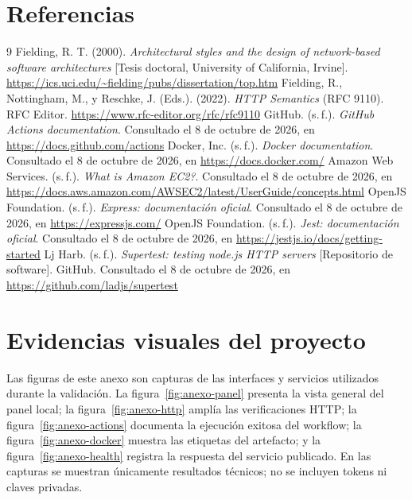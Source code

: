 \documentclass[12pt,letterpaper]{article}
\begin{document}
\section{Referencias}
\begin{thebibliography}{9}
 Fielding, R. T. (2000). \textit{Architectural styles and the design of network-based software architectures} [Tesis doctoral, University of California, Irvine]. \url{https://ics.uci.edu/~fielding/pubs/dissertation/top.htm}
 Fielding, R., Nottingham, M., y Reschke, J. (Eds.). (2022). \textit{HTTP Semantics} (RFC 9110). RFC Editor. \url{https://www.rfc-editor.org/rfc/rfc9110}
 GitHub. (s.\,f.). \textit{GitHub Actions documentation}. Consultado el 8 de octubre de 2026, en \url{https://docs.github.com/actions}
 Docker, Inc. (s.\,f.). \textit{Docker documentation}. Consultado el 8 de octubre de 2026, en \url{https://docs.docker.com/}
 Amazon Web Services. (s.\,f.). \textit{What is Amazon EC2?}. Consultado el 8 de octubre de 2026, en \url{https://docs.aws.amazon.com/AWSEC2/latest/UserGuide/concepts.html}
 OpenJS Foundation. (s.\,f.). \textit{Express: documentación oficial}. Consultado el 8 de octubre de 2026, en \url{https://expressjs.com/}
 OpenJS Foundation. (s.\,f.). \textit{Jest: documentación oficial}. Consultado el 8 de octubre de 2026, en \url{https://jestjs.io/docs/getting-started}
 Lj Harb. (s.\,f.). \textit{Supertest: testing node.js HTTP servers} [Repositorio de software]. GitHub. Consultado el 8 de octubre de 2026, en \url{https://github.com/ladjs/supertest}
\end{thebibliography}

\appendix
\section{Evidencias visuales del proyecto}
Las figuras de este anexo son capturas de las interfaces y servicios utilizados durante la validación. La figura~\ref{fig:anexo-panel} presenta la vista general del panel local; la figura~\ref{fig:anexo-http} amplía las verificaciones HTTP; la figura~\ref{fig:anexo-actions} documenta la ejecución exitosa del workflow; la figura~\ref{fig:anexo-docker} muestra las etiquetas del artefacto; y la figura~\ref{fig:anexo-health} registra la respuesta del servicio publicado. En las capturas se muestran únicamente resultados técnicos; no se incluyen tokens ni claves privadas.
\end{document}
